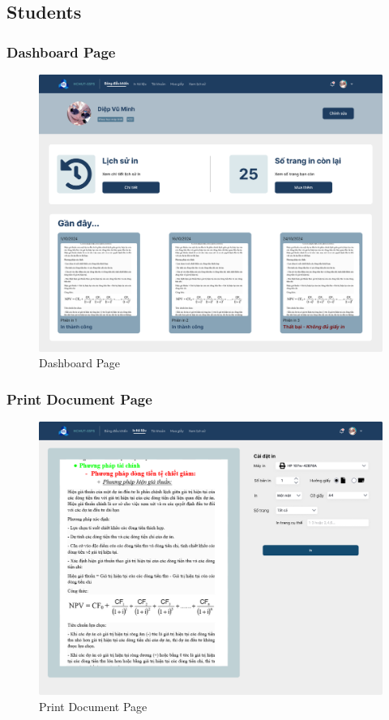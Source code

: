 \subsection{Students}
\subsubsection{Dashboard Page}
\begin{figure}[htbp]
     \centering
     \includegraphics[width=1\linewidth]{Images/UI/Dashboard_pages.png}
     \caption{Dashboard Page}
 \end{figure}
 \newpage
\subsubsection{Print Document Page}
\begin{figure}[htbp]
     \centering
     \includegraphics[width=1\linewidth]{Images/UI/Print_document_page.png}
     \caption{Print Document Page}
 \end{figure}
 \newpage
